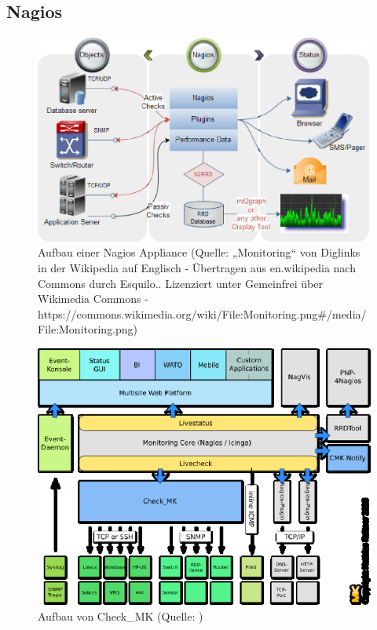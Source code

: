 \documentclass[12pt,a4paper,parskip]{scrreprt}
\begin{document}
	\subsection{Nagios}
	\begin{figure}
	\centering
	\includegraphics[scale=.5]{pics/NagiosMonitoring.eps}
    \caption[Grober Aufbau von Nagios]{Aufbau einer Nagios Appliance (Quelle: „Monitoring“ von Diglinks in der Wikipedia auf Englisch - Übertragen aus en.wikipedia nach Commons durch Esquilo.. Lizenziert unter Gemeinfrei über Wikimedia Commons - https://commons.wikimedia.org/wiki/File:Monitoring.png\#/media/File:Monitoring.png)}
	\end{figure}
	\begin{figure}
	\centering
	\includegraphics[]{pics/OMD_Schema.eps}
    \caption[Aufbau von Check\_MK]{Aufbau von Check\_MK (Quelle: \cite{checkmk})}
	\end{figure}
\end{document}
